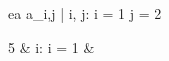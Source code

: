 \begin{eqcode}{e}{a }{}{}
  a_{i,j} | i, j: i = 1 \cap j = 2 \gets
  \begin{cases}
    5 & i: i = 1  & \otherwise \lend
  \end{cases} \lend
   \lend
\end{eqcode}
